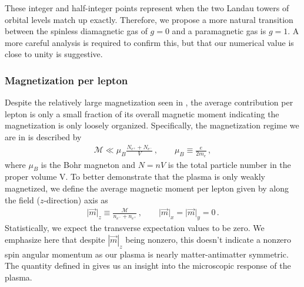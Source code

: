 These integer and half-integer points represent when the two Landau towers of orbital levels match up exactly. Therefore, we propose a more natural transition between the spinless diamagnetic gas of $g=0$ and a paramagnetic gas is $g=1$. A more careful analysis is required to confirm this, but that our numerical value is close to unity is suggestive.

\subsubsection{Magnetization per lepton}
\label{sec:perlepton}
\noindent Despite the relatively large magnetization seen in , the average contribution per lepton is only a small fraction of its overall magnetic moment indicating the magnetization is only loosely organized. Specifically, the magnetization regime we are in is described by
\begin{align}
 \label{fractionalmagnetization}
 \mathcal{M}\ll\mu_{B}\frac{N_{e^{+}}+N_{e^{-}}}{V}\,,\qquad\mu_{B}\equiv\frac{e}{2m_{e}}\,,
\end{align}
where $\mu_{B}$ is the Bohr magneton and $N=nV$ is the total particle number in the proper volume V. To better demonstrate that the plasma is only weakly magnetized, we define the average magnetic moment per lepton given by along the field ($z$-direction) axis as
\begin{align}
 \label{momentperlepton}
 \vert\vec{m}\vert_{z}\equiv\frac{\mathcal{M}}{n_{e^{-}}+n_{e^{+}}}\,,\qquad\vert\vec{m}\vert_{x}=\vert\vec{m}\vert_{y}=0\,.
\end{align}
Statistically, we expect the transverse expectation values to be zero. We emphasize here that despite $|\vec{m}|_{z}$ being nonzero, this doesn't indicate a nonzero spin angular momentum as our plasma is nearly matter-antimatter symmetric. The quantity defined in  gives us an insight into the microscopic response of the plasma.

